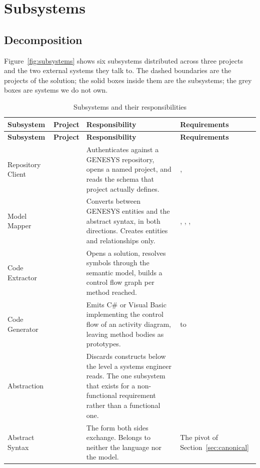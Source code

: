 \chapter{Subsystems}
\label{ch:subsystems}

\section{Decomposition}


Figure~\ref{fig:subsystems} shows six subsystems distributed across three
projects and the two external systems they talk to. The dashed boundaries are
the projects of the solution; the solid boxes inside them are the subsystems;
the grey boxes are systems we do not own.

\begin{longtable}{L{0.18\textwidth}L{0.21\textwidth}L{0.30\textwidth}L{0.17\textwidth}}
	\caption{Subsystems and their responsibilities}\label{tab:subsystems}\\
	\toprule
	\textbf{Subsystem} & \textbf{Project} & \textbf{Responsibility} & \textbf{Requirements} \\
	\midrule
	\endfirsthead
	\toprule
	\textbf{Subsystem} & \textbf{Project} & \textbf{Responsibility} & \textbf{Requirements} \\
	\midrule
	\endhead

	Repository Client &  & Authenticates against a
	GENESYS repository, opens a named project, and reads the schema that
	project actually defines. & ,  \\
	\addlinespace
	Model Mapper &  & Converts between GENESYS
	entities and the abstract syntax, in both directions. Creates entities and
	relationships only. & , , ,  \\
	\addlinespace
	Code Extractor &  & Opens a solution, resolves
	symbols through the semantic model, builds a control flow graph per method
	reached. &  \\
	\addlinespace
	Code Generator &  & Emits C\# or Visual Basic
	implementing the control flow of an activity diagram, leaving method
	bodies as prototypes. &  to  \\
	\addlinespace
	Abstraction &  & Discards constructs below the
	level a systems engineer reads. The one subsystem that exists for a
	non-functional requirement rather than a functional one. &  \\
	\addlinespace
	Abstract Syntax &  & The form both sides exchange.
	Belongs to neither the language nor the model. & The pivot of
	Section~\ref{sec:canonical} \\
	\bottomrule
\end{longtable}

